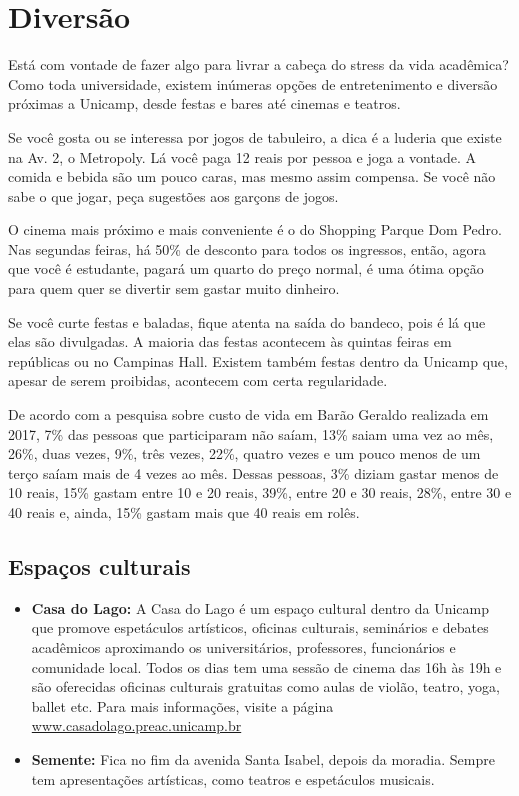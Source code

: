 
\section{Diversão}

Está com vontade de fazer algo para livrar a cabeça do stress da vida
acadêmica? Como toda universidade, existem inúmeras opções de entretenimento e
diversão próximas a Unicamp, desde festas e bares até cinemas e teatros.

Se você gosta ou se interessa por jogos de tabuleiro, a dica é a luderia que
existe na Av. 2, o Metropoly. Lá você paga 12 reais por pessoa e joga a
vontade. A comida e bebida são um pouco caras, mas mesmo assim compensa. Se
você não sabe o que jogar, peça sugestões aos garçons de jogos.

O cinema mais próximo e mais conveniente é o do Shopping Parque Dom Pedro. Nas
segundas feiras, há 50\% de desconto para todos os ingressos, então, agora que
você é estudante, pagará um quarto do preço normal, é uma ótima opção para quem
quer se divertir sem gastar muito dinheiro.

Se você curte festas e baladas, fique atenta na saída do bandeco, pois é lá que
elas são divulgadas. A maioria das festas acontecem às quintas feiras em
repúblicas ou no Campinas Hall. Existem também festas dentro da Unicamp que,
apesar de serem proibidas, acontecem com certa regularidade.

De acordo com a pesquisa sobre custo de vida em Barão Geraldo realizada em
2017, 7\% das pessoas que participaram não saíam, 13\% saiam uma vez ao mês,
26\%, duas vezes, 9\%, três vezes, 22\%, quatro vezes e um pouco menos de um
terço saíam mais de 4 vezes ao mês. Dessas pessoas, 3\% diziam gastar menos de
10 reais, 15\% gastam entre 10 e 20 reais, 39\%, entre 20 e 30 reais, 28\%,
entre 30 e 40 reais e, ainda, 15\% gastam mais que 40 reais em rolês.

\subsection{Espaços culturais}

\begin{itemize}
\item \textbf{Casa do Lago:} A Casa do Lago é um espaço cultural dentro da
  Unicamp que promove espetáculos artísticos, oficinas culturais, seminários e
  debates acadêmicos aproximando os universitários, professores, funcionários e
  comunidade local. Todos os dias tem uma sessão de cinema das 16h às 19h e são
  oferecidas oficinas culturais gratuitas como aulas de violão, teatro, yoga,
  ballet etc. Para mais informações, visite a página
  \url{www.casadolago.preac.unicamp.br}

\item \textbf{Semente:} Fica no fim da avenida Santa Isabel, depois da moradia.
  Sempre tem apresentações artísticas, como teatros e espetáculos musicais.
\end{itemize}

